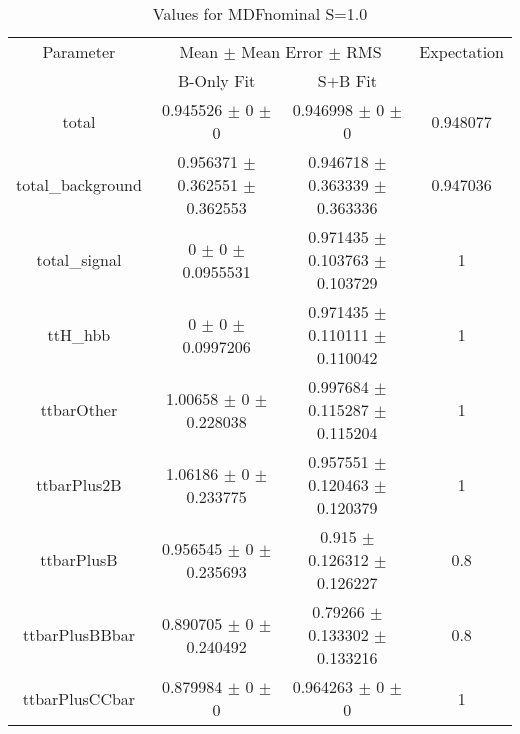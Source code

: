 \begin{table}
\centering
\caption{Values for MDFnominal S=1.0}
\begin{tabular}{cccc}
\toprule
Parameter & \multicolumn{2}{c}{Mean $\pm$ Mean Error $\pm$ RMS} & Expectation\\
 & B-Only Fit & S+B Fit & \\
\midrule
total & \num{0.945526} $\pm$ \num{0} $\pm$ \num{0} & \num{0.946998} $\pm$ \num{0} $\pm$ \num{0} & \num{0.948077}\\
total\_background & \num{0.956371} $\pm$ \num{0.362551} $\pm$ \num{0.362553} & \num{0.946718} $\pm$ \num{0.363339} $\pm$ \num{0.363336} & \num{0.947036}\\
total\_signal & \num{0} $\pm$ \num{0} $\pm$ \num{0.0955531} & \num{0.971435} $\pm$ \num{0.103763} $\pm$ \num{0.103729} & \num{1}\\
ttH\_hbb & \num{0} $\pm$ \num{0} $\pm$ \num{0.0997206} & \num{0.971435} $\pm$ \num{0.110111} $\pm$ \num{0.110042} & \num{1}\\
ttbarOther & \num{1.00658} $\pm$ \num{0} $\pm$ \num{0.228038} & \num{0.997684} $\pm$ \num{0.115287} $\pm$ \num{0.115204} & \num{1}\\
ttbarPlus2B & \num{1.06186} $\pm$ \num{0} $\pm$ \num{0.233775} & \num{0.957551} $\pm$ \num{0.120463} $\pm$ \num{0.120379} & \num{1}\\
ttbarPlusB & \num{0.956545} $\pm$ \num{0} $\pm$ \num{0.235693} & \num{0.915} $\pm$ \num{0.126312} $\pm$ \num{0.126227} & \num{0.8}\\
ttbarPlusBBbar & \num{0.890705} $\pm$ \num{0} $\pm$ \num{0.240492} & \num{0.79266} $\pm$ \num{0.133302} $\pm$ \num{0.133216} & \num{0.8}\\
ttbarPlusCCbar & \num{0.879984} $\pm$ \num{0} $\pm$ \num{0} & \num{0.964263} $\pm$ \num{0} $\pm$ \num{0} & \num{1}\\
\bottomrule
\end{tabular}
\end{table}